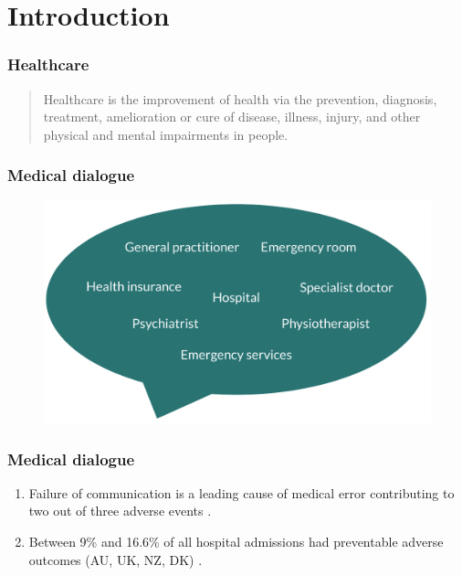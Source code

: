 
\section{Introduction}


\begin{frame}
    \frametitle{Healthcare}
    \begin{quotation}
        \noindent\centering
        Healthcare is the improvement of health via the {\color{dtured}prevention}, {\color{dtured}diagnosis}, {\color{dtured}treatment}, {\color{dtured}amelioration} or {\color{dtured}cure} of {\color{theme-green}disease}, {\color{theme-green}illness}, {\color{theme-green}injury}, and {\color{theme-green}other physical and mental impairments} in people.
    \end{quotation}
\end{frame}


\begin{frame}
    \frametitle{Medical dialogue}
    \begin{figure}
        \centering
        \includegraphics[width=0.7\paperwidth]{figures/speech_bubble.pdf}
    \end{figure}

    \note[item]{}
\end{frame}


\begin{frame}
    \frametitle{Medical dialogue}
    \begin{enumerate}
        \item Failure of communication is a leading cause of medical error contributing to two out of three adverse events \cite{starmer_changes_2014}.
        \item Between 9\% and 16.6\% of all hospital admissions had preventable adverse outcomes (AU, UK, NZ, DK) \cite{carver_medical_2024}.
    \end{enumerate}
\end{frame}


